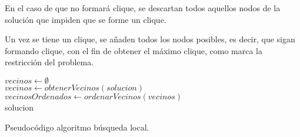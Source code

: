 En el caso de que no formará clique, se descartan todos aquellos nodos de la solución que impiden que se forme un clique.

Un vez se tiene un clique, se añaden todos los nodos posibles, es decir, que sigan formando clique, con el fin de obtener el máximo clique, como marca la restricción del problema.

\begin{algorithm}
	$ vecinos \gets \emptyset $ \\[0.2cm]
	$ vecinos \gets obtenerVecinos(solucion)$ \\[0.2cm]
	$ vecinosOrdenados \gets ordenarVecinos(vecinos)$ \\[0.2cm]
	\Return solucion
	\caption{Pseudocódigo algoritmo búsqueda local.}
	\label{alg:bl}
\end{algorithm}


